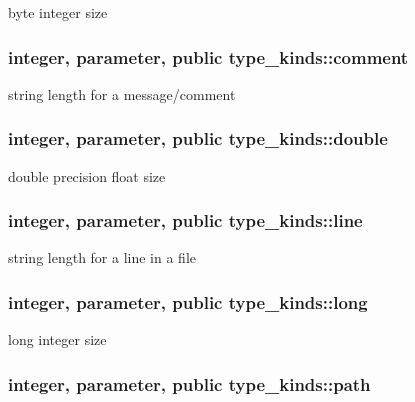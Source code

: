 byte integer size 

\hypertarget{classtype__kinds_abb1584a815b1c1b79301d6f922366eec}{
\subsubsection[{comment}]{\setlength{\rightskip}{0pt plus 5cm}integer, parameter, public type\-\_\-kinds\-::comment}}\label{classtype__kinds_abb1584a815b1c1b79301d6f922366eec}


string length for a message/comment 

\hypertarget{classtype__kinds_a34b12277eb02d1bbaaaae83e033d9890}{
\subsubsection[{double}]{\setlength{\rightskip}{0pt plus 5cm}integer, parameter, public type\-\_\-kinds\-::double}}\label{classtype__kinds_a34b12277eb02d1bbaaaae83e033d9890}


double precision float size 

\hypertarget{classtype__kinds_af0560ef37c612847670ffbfba8a9bc33}{
\subsubsection[{line}]{\setlength{\rightskip}{0pt plus 5cm}integer, parameter, public type\-\_\-kinds\-::line}}\label{classtype__kinds_af0560ef37c612847670ffbfba8a9bc33}


string length for a line in a file 

\hypertarget{classtype__kinds_a14af3c9d56db49c61252b056506a584a}{
\subsubsection[{long}]{\setlength{\rightskip}{0pt plus 5cm}integer, parameter, public type\-\_\-kinds\-::long}}\label{classtype__kinds_a14af3c9d56db49c61252b056506a584a}


long integer size 

\hypertarget{classtype__kinds_a05ab6f6ff4279480c4fd6d8b04a3efbf}{
\subsubsection[{path}]{\setlength{\rightskip}{0pt plus 5cm}integer, parameter, public type\-\_\-kinds\-::path}}\label{classtype__kinds_a05ab6f6ff4279480c4fd6d8b04a3efbf}


